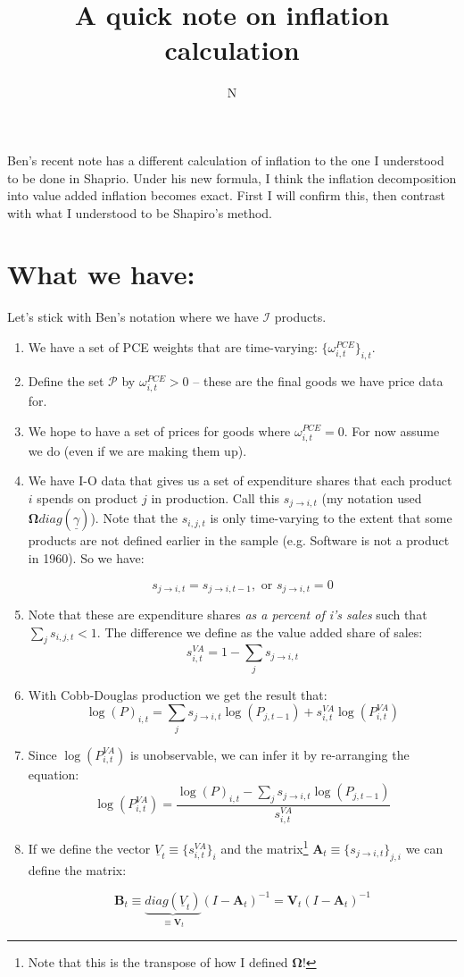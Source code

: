 \documentclass[12pt,english]{article}
\begin{document}
\title{A quick note on inflation calculation}
\author{N}
\maketitle

Ben's recent note has a different calculation of inflation to the one I understood to be done in Shaprio. Under his new formula, I think the inflation decomposition into value added inflation becomes exact. First I will confirm this, then contrast with what I understood to be Shapiro's method.

\section{What we have:}

Let's stick with Ben's notation where we have $\mathcal{I}$ products. 
\begin{enumerate}
\item We have a set of PCE weights that are time-varying: $\{\omega_{i,t}^{PCE}\}_{i,t}$. 
\item Define the set $\mathcal{P}$ by $\omega_{i,t}^{PCE}>0$ -- these are the final goods we have price data for.
\item We hope to have a set of prices for goods where $\omega_{i,t}^{PCE}=0$. For now assume we do (even if we are making them up).
\item We have I-O data that gives us a set of expenditure shares that each product $i$ spends on product $j$ in production. Call this $s_{j\rightarrow i,t}$ (my notation used $\mathbf{\Omega}diag(\underline{\gamma})$). Note that the $s_{i,j,t}$ is only time-varying to the extent that some products are not defined earlier in the sample (e.g. Software is not a product in 1960). So we have:

\[
	s_{j\rightarrow i,t} = s_{j\rightarrow i,t-1},\text{ or } s_{j\rightarrow i,t}=0
\]

\item Note that these are expenditure shares \emph{as a percent of i's sales} such that $\sum_j s_{i,j,t}<1$. The difference we define as the value added share of sales:
\[
	s_{i,t}^{VA} = 1-\sum_j s_{j\rightarrow i,t}
\]
\item With Cobb-Douglas production we get the result that:
\[
	\log(P)_{i,t} = \sum_j s_{j\rightarrow i,t} \log(P_{j,t-1}) + s_{i,t}^{VA} \log(P_{i,t}^{VA}) 
\]
\item Since $\log(P_{i,t}^{VA})$ is unobservable, we can infer it by re-arranging the equation:
\[
	\log(P_{i,t}^{VA}) = \frac{\log(P)_{i,t}  - \sum_j s_{j\rightarrow i,t} \log(P_{j,t-1})}{s_{i,t}^{VA}}
\]
\item If we define the vector $\underline{V}_t \equiv \{s_{i,t}^{VA}\}_i$ and the matrix\footnote{Note that this is the transpose of how I defined $\mathbold{\Omega}$!} $\mathbold{A}_t\equiv \{s_{j\rightarrow i,t}\}_{j,i}$ we can define the matrix:

\[
	\mathbold{B}_t \equiv\underbrace{diag(\underline{V}_t)}_{\equiv \mathbold{V}_t}(I-\mathbold{A}_t)^{-1} = \mathbold{V}_t (I-\mathbold{A}_t)^{-1}
\]
\end{enumerate}
\end{document}
